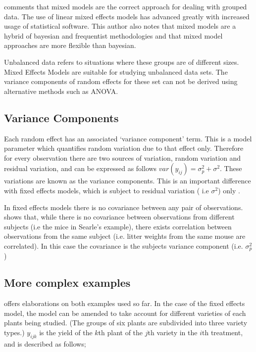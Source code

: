 \documentclass[12pt, a4paper]{report}
\theoremstyle{plain}
\theoremstyle{definition}
\theoremstyle{remark}
\begin{document}
\citet{Demi} comments that mixed models are the correct approach
for dealing with grouped data. The use of linear mixed effects
models has advanced greatly with increased usage of statistical
software. This author also notes that mixed models are a hybrid of
bayesian and frequentist methodologies and that mixed model
approaches are more flexible than bayesian.


Unbalanced data refers to situations where these groups are
of different sizes. Mixed Effects Models are suitable for studying
unbalanced data sets. The variance components of random effects
for these set can not be derived using alternative methods such as
ANOVA.


\subsection{Variance Components}
Each random effect has an associated `variance component' term.
This is a model parameter which quantifies random variation due to
that effect only. Therefore for every observation there are two
sources of variation, random variation and residual variation, and
can be expressed as follows $var(y_{ij})=\sigma^{2}_{p} +
\sigma^{2}$. These variations are known as the variance
components. This is an important difference with fixed effects
models, which is subject to residual variation ( i.e $\sigma^{2}$)
only \citep{BrownPrescott}.

In fixed effects models there is no covariance between any pair of
observations. \citet*{BrownPrescott} shows that, while there is no
covariance between observations from different subjects (i.e the
mice in Searle's example), there exists correlation between
observations from the same subject (i.e. litter weights from the
same mouse are correlated). In this case the covariance is the
subjects variance component (i.e. $\sigma^{2}_{p}$)

\newpage


\subsection{More complex examples}
\citet{Searle} offers elaborations on both examples used so far.
In the case of the fixed effects model, the model can be amended
to take account for different varieties of each plants being
studied. (The groups of six plants are subdivided into three
variety types.) $y_{ijk}$ is the yield of the $k$th plant of the
$j$th variety in the $i$th treatment, and is described as follows;
\end{document}

